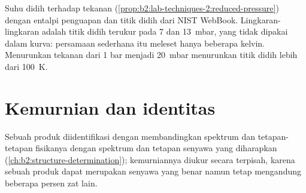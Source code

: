 \begin{omfigure}

{\small Suhu didih terhadap tekanan (\cref{prop:b2:lab-techniques-2:reduced-pressure})
dengan entalpi penguapan dan titik didih dari NIST WebBook. Lingkaran-lingkaran
adalah titik didih terukur pada 7 dan \qty{13}{mbar}, yang tidak dipakai
dalam kurva: persamaan sederhana itu meleset hanya beberapa kelvin.
Menurunkan tekanan dari 1 bar menjadi \qty{20}{mbar} menurunkan titik didih
lebih dari
\qty{100}{K}.}
\end{omfigure}

\section{Kemurnian dan identitas}

Sebuah produk diidentifikasi dengan membandingkan spektrum dan
tetapan-tetapan fisikanya dengan spektrum dan tetapan senyawa yang
diharapkan (\cref{ch:b2:structure-determination}); kemurniannya diukur
secara terpisah, karena sebuah produk dapat merupakan senyawa yang benar
namun tetap mengandung beberapa persen zat lain.

